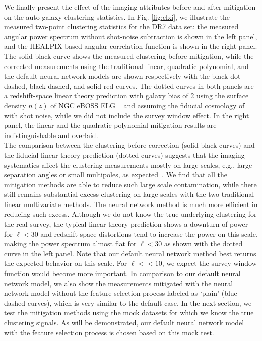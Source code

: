 \documentclass[fleqn, usenatbib]{mnras}
\begin{document}
We finally present the effect of the imaging attributes before and after mitigation on the auto galaxy clustering statistics. In Fig. \ref{fig:clxi}, we illustrate the measured two-point clustering statistics for the DR7 data set: the measured angular power spectrum without shot-noise subtraction is shown in the left panel, and the HEALPIX-based angular correlation function is shown in the right panel. The solid black curve shows the measured clustering before mitigation, while the corrected measurements using the traditional linear, quadratic polynomial, and the default neural network models are shown respectively with the black dot-dashed, black dashed, and solid red curves. The dotted curves in both panels are a redshift-space linear theory prediction with galaxy bias of 2 using the surface density $n(z)$ of NGC eBOSS ELG ~\citep[Tab. 4 of][]{Raichoor2017MNRAS.471.3955R} and assuming the fiducial cosmology of \citet{ross2011ameliorating,2012ApJ...761...14H} with shot noise, while we did not include the survey window effect. In the right panel, the linear and the quadratic polynomial mitigation results are indistinguishable and overlaid.\\ 

The comparison between the clustering before correction (solid black curves) and the fiducial linear theory prediction (dotted curves) suggests that the imaging systematics affect the clustering measurements mostly on large scales, e.g., large separation angles or small multipoles, as expected~\citep[see e.g.,][]{myers2007clustering, ross2007higher, huterer2013calibration}. We find that all the mitigation methods are able to reduce such large scale contamination, while there still remains substantial excess clustering on large scales with the two traditional linear multivariate methods. The neural network method is much more efficient in reducing such excess. Although we do not know the true underlying clustering for the real survey, the typical linear theory prediction shows a downturn of power for $\ell<30$ and redshift-space distortions tend to increase the power on this scale, making the power spectrum almost flat for $\ell<30$ as shown with the dotted curve in the left panel. Note that our default neural network method best returns the expected behavior on this scale. For $\ell << 10$, we expect the survey window function would become more important. In comparison to our default neural network model, we also show the measurements mitigated with the neural network model without the feature selection process labeled as `plain' (blue dashed curves), which is very similar to the default case. In the next section, we test the mitigation methods using the mock datasets for which we know the true clustering signals. As will be demonstrated, our default neural network model with the feature selection process is chosen based on this mock test. \\
\end{document}
